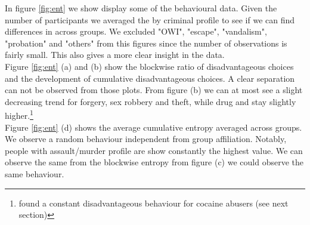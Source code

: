 \documentclass[12pt,a4paper,bibliography=totocnumbered,listof=totocnumbered]{scrartcl}
\begin{document}
\begin{table}[H]
	\scriptsize
	 \centering 
	 		\caption{Summary prison data (means with standard deviation in parenthesis)} 
		\label{tab:tabps} 
\end{table} 

In figure \ref{fig:ent} we show display some of the behavioural data. Given the number of participants we averaged the by criminal profile to see if we can find differences in across groups. We excluded "OWI", "escape", "vandalism", "probation" and "others" from this figures since the number of observations is fairly small. This also gives a more clear insight in the data.\\
Figure \ref{fig:ent} (a) and (b) show the blockwise ratio of disadvantageous choices and the development of cumulative disadvantageous choices. A clear separation can not be observed from those plots. From figure (b) we can at most see a slight decreasing trend for forgery, sex robbery and theft, while drug and stay slightly higher.\footnote{\cite{stout2004} found a constant disadvantageous behaviour for cocaine abusers (see next section)}\\
Figure \ref{fig:ent} (d) shows the average cumulative entropy averaged across groups. We observe a random behaviour independent from group affiliation. Notably, people with assault/murder profile are show constantly the highest value. We can observe the same from the blockwise entropy from figure (c) we could observe the same behaviour.
\end{document}
